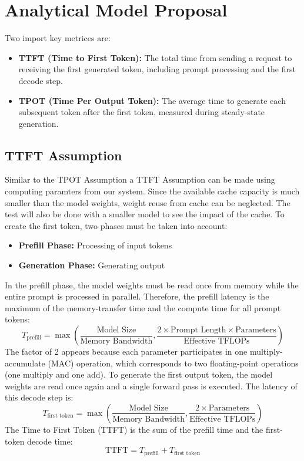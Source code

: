 \documentclass[11pt,a4paper]{article}
\begin{document}
\section{Analytical Model Proposal}
\label{sec:analytical-model-proposal}
Two import key metrices are:
\begin{itemize}
    \item \textbf{TTFT (Time to First Token):} The total time from sending a request to receiving the first generated token, including prompt processing and the first decode step.
    \item \textbf{TPOT (Time Per Output Token):} The average time to generate each subsequent token after the first token, measured during steady-state generation.
\end{itemize}

\subsection{TTFT Assumption}
Similar to the TPOT Assumption a TTFT Assumption can be made using computing paramters from our system.
Since the available cache capacity is much smaller than the model weights, weight reuse from cache can be neglected. The test will also be done with a smaller model to see the impact of the cache.
To create the first token, two phases must be taken into account:
\begin{itemize}
    \item \textbf{Prefill Phase:} Processing of input tokens
    \item \textbf{Generation Phase:} Generating output
\end{itemize}
In the prefill phase, the model weights must be read once from memory while the entire prompt is processed in parallel. Therefore, the prefill latency is the maximum of the memory-transfer time and the compute time for all prompt tokens:
\begin{equation}
T_{\text{prefill}} = \max\left(
    \frac{\text{Model Size}}{\text{Memory Bandwidth}},
    \frac{2 \times \text{Prompt Length} \times \text{Parameters}}{\text{Effective TFLOPs}}
\right)
\end{equation}
The factor of 2 appears because each parameter participates in one multiply-accumulate (MAC) operation, which corresponds to two floating-point operations (one multiply and one add).
To generate the first output token, the model weights are read once again and a single forward pass is executed. The latency of this decode step is:
\begin{equation}
T_{\text{first token}} = \max\left(
    \frac{\text{Model Size}}{\text{Memory Bandwidth}},
    \frac{2 \times \text{Parameters}}{\text{Effective TFLOPs}}
\right)
\end{equation}
The Time to First Token (TTFT) is the sum of the prefill time and the first-token decode time:
\begin{equation}
\text{TTFT} = T_{\text{prefill}} + T_{\text{first token}}
\end{equation}
\end{document}
